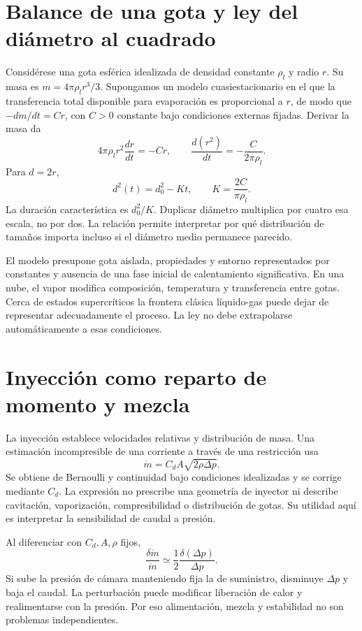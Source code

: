 \section{Balance de una gota y ley del diámetro al cuadrado}
Considérese una gota esférica idealizada de densidad constante $\rho_l$ y radio $r$. Su masa es $m=4\pi\rho_lr^3/3$. Supongamos un modelo cuasiestacionario en el que la transferencia total disponible para evaporación es proporcional a $r$, de modo que $-dm/dt=C r$, con $C>0$ constante bajo condiciones externas fijadas. Derivar la masa da
\[
 4\pi\rho_l r^2\frac{dr}{dt}=-Cr,
 \qquad \frac{d(r^2)}{dt}=-\frac{C}{2\pi\rho_l}.
\]
Para $d=2r$,
\begin{equation}\label{eq:d2}
 d^2(t)=d_0^2-Kt,\qquad K=\frac{2C}{\pi\rho_l}.
\end{equation}
La duración característica es $d_0^2/K$. Duplicar diámetro multiplica por cuatro esa escala, no por dos. La relación permite interpretar por qué distribución de tamaños importa incluso si el diámetro medio permanece parecido.

El modelo presupone gota aislada, propiedades y entorno representados por constantes y ausencia de una fase inicial de calentamiento significativa. En una nube, el vapor modifica composición, temperatura y transferencia entre gotas. Cerca de estados supercríticos la frontera clásica líquido-gas puede dejar de representar adecuadamente el proceso. La ley no debe extrapolarse automáticamente a esas condiciones.
\section{Inyección como reparto de momento y mezcla}
La inyección establece velocidades relativas y distribución de masa. Una estimación incompresible de una corriente a través de una restricción usa
\[
 \dot m=C_d A\sqrt{2\rho\Delta p}.
\]
Se obtiene de Bernoulli y continuidad bajo condiciones idealizadas y se corrige mediante $C_d$. La expresión no prescribe una geometría de inyector ni describe cavitación, vaporización, compresibilidad o distribución de gotas. Su utilidad aquí es interpretar la sensibilidad de caudal a presión.

Al diferenciar con $C_d,A,\rho$ fijos,
\[
 \frac{\delta\dot m}{\dot m}\simeq\frac12\frac{\delta(\Delta p)}{\Delta p}.
\]
Si sube la presión de cámara manteniendo fija la de suministro, disminuye $\Delta p$ y baja el caudal. La perturbación puede modificar liberación de calor y realimentarse con la presión. Por eso alimentación, mezcla y estabilidad no son problemas independientes.

